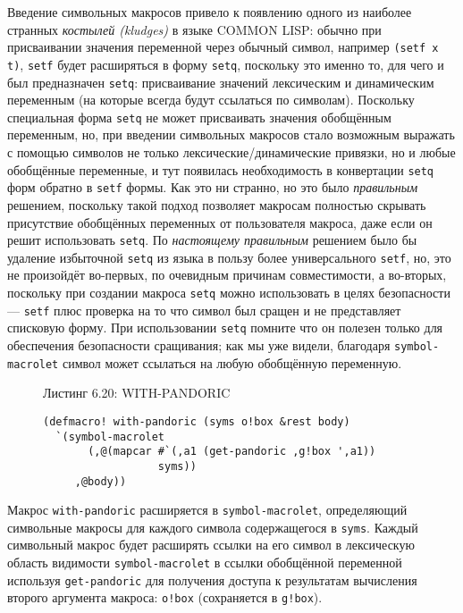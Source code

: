 Введение символьных макросов привело к появлению одного из наиболее странных \emph{костылей (kludges)} в языке COMMON LISP: обычно при присваивании значения переменной через обычный символ, например \verb"(setf x t)", \verb"setf" будет расширяться в форму \verb"setq", поскольку это именно то, для чего и был предназначен \verb"setq": присваивание значений лексическим и динамическим переменным (на которые всегда будут ссылаться по символам). Поскольку специальная форма \verb"setq" не может присваивать значения обобщённым переменным, но, при введении символьных макросов стало возможным выражать с помощью символов не только лексические/динамические привязки, но и любые обобщённые переменные, и тут появилась необходимость в конвертации \verb"setq" форм обратно в \verb"setf" формы. Как это ни странно, но это было \emph{правильным} решением, поскольку такой подход позволяет макросам полностью скрывать присутствие обобщённых переменных от пользователя макроса, даже если он решит использовать \verb"setq". По \emph{настоящему правильным} решением было бы удаление избыточной \verb"setq" из языка в пользу более универсального \verb"setf", но, это не произойдёт во-первых, по очевидным причинам совместимости, а во-вторых, поскольку при создании макроса \verb"setq" можно использовать в целях безопасности --- \verb"setf" плюс проверка на то что символ был сращен и не представляет списковую форму. При использовании \verb"setq" помните что он полезен только для обеспечения безопасности сращивания; как мы уже видели, благодаря \verb"symbol-macrolet" символ может ссылаться на любую обобщённую переменную.

\begin{figure}Листинг 6.20: WITH-PANDORIC\label{listing_6.20}
\listbegin
\begin{verbatim}
(defmacro! with-pandoric (syms o!box &rest body)
  `(symbol-macrolet
       (,@(mapcar #`(,a1 (get-pandoric ,g!box ',a1))
                  syms))
     ,@body))
\end{verbatim}
\listend
\end{figure}

Макрос \verb"with-pandoric" расширяется в \verb"symbol-macrolet", определяющий символьные макросы для каждого символа содержащегося в \verb"syms". Каждый символьный макрос будет расширять ссылки на его символ в лексическую область видимости \verb"symbol-macrolet" в ссылки обобщённой переменной используя \verb"get-pandoric" для получения доступа к результатам вычисления второго аргумента макроса: \verb"o!box" (сохраняется в \verb"g!box").

